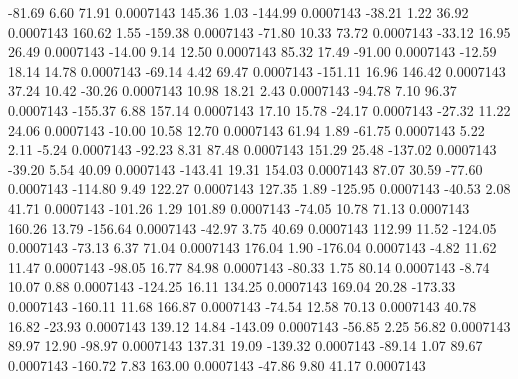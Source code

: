       -81.69        6.60       71.91     0.0007143
      145.36        1.03     -144.99     0.0007143
      -38.21        1.22       36.92     0.0007143
      160.62        1.55     -159.38     0.0007143
      -71.80       10.33       73.72     0.0007143
      -33.12       16.95       26.49     0.0007143
      -14.00        9.14       12.50     0.0007143
       85.32       17.49      -91.00     0.0007143
      -12.59       18.14       14.78     0.0007143
      -69.14        4.42       69.47     0.0007143
     -151.11       16.96      146.42     0.0007143
       37.24       10.42      -30.26     0.0007143
       10.98       18.21        2.43     0.0007143
      -94.78        7.10       96.37     0.0007143
     -155.37        6.88      157.14     0.0007143
       17.10       15.78      -24.17     0.0007143
      -27.32       11.22       24.06     0.0007143
      -10.00       10.58       12.70     0.0007143
       61.94        1.89      -61.75     0.0007143
        5.22        2.11       -5.24     0.0007143
      -92.23        8.31       87.48     0.0007143
      151.29       25.48     -137.02     0.0007143
      -39.20        5.54       40.09     0.0007143
     -143.41       19.31      154.03     0.0007143
       87.07       30.59      -77.60     0.0007143
     -114.80        9.49      122.27     0.0007143
      127.35        1.89     -125.95     0.0007143
      -40.53        2.08       41.71     0.0007143
     -101.26        1.29      101.89     0.0007143
      -74.05       10.78       71.13     0.0007143
      160.26       13.79     -156.64     0.0007143
      -42.97        3.75       40.69     0.0007143
      112.99       11.52     -124.05     0.0007143
      -73.13        6.37       71.04     0.0007143
      176.04        1.90     -176.04     0.0007143
       -4.82       11.62       11.47     0.0007143
      -98.05       16.77       84.98     0.0007143
      -80.33        1.75       80.14     0.0007143
       -8.74       10.07        0.88     0.0007143
     -124.25       16.11      134.25     0.0007143
      169.04       20.28     -173.33     0.0007143
     -160.11       11.68      166.87     0.0007143
      -74.54       12.58       70.13     0.0007143
       40.78       16.82      -23.93     0.0007143
      139.12       14.84     -143.09     0.0007143
      -56.85        2.25       56.82     0.0007143
       89.97       12.90      -98.97     0.0007143
      137.31       19.09     -139.32     0.0007143
      -89.14        1.07       89.67     0.0007143
     -160.72        7.83      163.00     0.0007143
      -47.86        9.80       41.17     0.0007143
